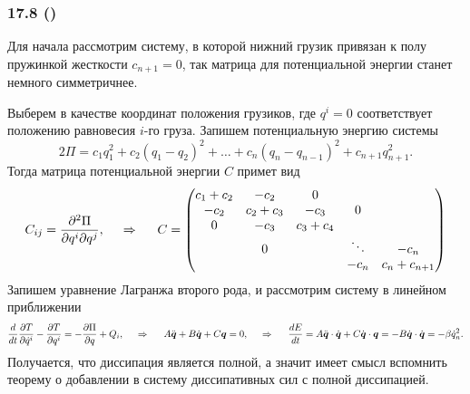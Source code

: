 \subsubsection*{17.8 (\checkmark)}

Для начала рассмотрим систему, в которой нижний грузик привязан к полу пружинкой жесткости $c_{n+1} = 0$, так матрица для потенциальной энергии станет немного симметричнее. 

Выберем в качестве координат положения грузиков, где $q^i = 0$ соответствует положению равновесия $i$-го груза.  
Запишем потенциальную энергию системы
\begin{equation*}
    2 \Pi = c_1 q_1^2 + c_2(q_1-q_2)^2 + \ldots + c_n (q_n-q_{n-1})^2 + c_{n+1} q_{n+1}^2.
\end{equation*}
Тогда матрица потенциальной энергии $C$ примет вид
\begin{equation*}
    C_{ij} = \frac{\partial^2 \Pi}{\partial q^i \partial q^j},
    \hspace{0.5cm} \Rightarrow \hspace{0.5cm}
    C = \begin{pmatrix}
        c_1 + c_2 & -c_2 & 0 &  &  \\
        -c_2 & c_2 + c_3 & -c_3 & 0 &  \\
        0 & -c_3 & c_3 + c_4 &  &   \\
         & 0 &  & \ddots & -c_n \\
         &  &  & -c_n & c_n + c_{n+1}
    \end{pmatrix}
\end{equation*}
Запишем уравнение Лагранжа второго рода, и рассмотрим систему в линейном приближении
\begin{equation*}
    \frac{d }{d t} \frac{\partial T}{\partial \dot{q}^i} - \frac{\partial T}{\partial q^i}
     = - \frac{\partial \Pi}{\partial q} + Q_i,
     \hspace{0.5cm} \Rightarrow \hspace{0.5cm}
     A \ddot{\mbox{\boldmath $q$}} + B \dot{\mbox{\boldmath $q$}} + C \mbox{\boldmath $q$} = 0,
     \hspace{0.5cm} \Rightarrow \hspace{0.5cm}
     \frac{d E}{d t} =
     A \ddot{\mbox{\boldmath $q$}} \cdot \dot{\mbox{\boldmath $q$}} + C \dot{\mbox{\boldmath $q$}} \cdot \mbox{\boldmath $q$} = - B \dot{\mbox{\boldmath $q$}} \cdot \dot{\mbox{\boldmath $q$}} = - \beta \dot{q}_n^2.
\end{equation*}
Получается, что диссипация является полной, а значит имеет смысл вспомнить теорему о добавлении в систему диссипативных сил с полной диссипацией.

